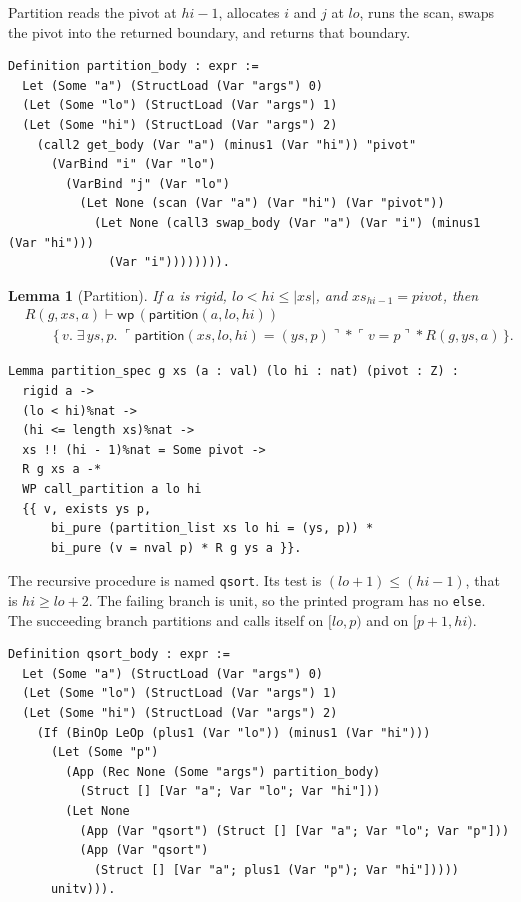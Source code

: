 \documentclass[11pt]{article}
\newtheorem{lemma}[theorem]{Lemma}
\newcommand{\sep}{\mathbin{*}}
\newcommand{\Wpre}{\mathsf{wp}}
\newcommand{\pure}[1]{\ulcorner #1 \urcorner}
\begin{document}
Partition reads the pivot at \(hi - 1\), allocates \(i\) and \(j\) at \(lo\), runs the scan, swaps the pivot into the returned boundary, and returns that boundary.

\begin{lstlisting}
Definition partition_body : expr :=
  Let (Some "a") (StructLoad (Var "args") 0)
  (Let (Some "lo") (StructLoad (Var "args") 1)
  (Let (Some "hi") (StructLoad (Var "args") 2)
    (call2 get_body (Var "a") (minus1 (Var "hi")) "pivot"
      (VarBind "i" (Var "lo")
        (VarBind "j" (Var "lo")
          (Let None (scan (Var "a") (Var "hi") (Var "pivot"))
            (Let None (call3 swap_body (Var "a") (Var "i") (minus1 (Var "hi")))
              (Var "i")))))))).
\end{lstlisting}

\begin{lemma}[Partition]
If \(a\) is rigid, \(lo < hi \le \lvert xs \rvert\), and \(xs_{hi-1} = \mathit{pivot}\), then
\[
\begin{aligned}
&R(g, xs, a) \vdash \Wpre\,(\mathsf{partition}(a, lo, hi))\\
&\qquad \{\,v.\; \exists\, ys, p.\;
  \pure{\mathsf{partition}(xs, lo, hi) = (ys, p)} \sep
  \pure{v = p} \sep R(g, ys, a)\,\}.
\end{aligned}
\]
\end{lemma}

\begin{lstlisting}
Lemma partition_spec g xs (a : val) (lo hi : nat) (pivot : Z) :
  rigid a ->
  (lo < hi)%nat ->
  (hi <= length xs)%nat ->
  xs !! (hi - 1)%nat = Some pivot ->
  R g xs a -*
  WP call_partition a lo hi
  {{ v, exists ys p,
      bi_pure (partition_list xs lo hi = (ys, p)) *
      bi_pure (v = nval p) * R g ys a }}.
\end{lstlisting}

The recursive procedure is named \texttt{qsort}.
Its test is \((lo + 1) \le (hi - 1)\), that is \(hi \ge lo + 2\).
The failing branch is unit, so the printed program has no \texttt{else}.
The succeeding branch partitions and calls itself on \([lo, p)\) and on \([p+1, hi)\).

\begin{lstlisting}
Definition qsort_body : expr :=
  Let (Some "a") (StructLoad (Var "args") 0)
  (Let (Some "lo") (StructLoad (Var "args") 1)
  (Let (Some "hi") (StructLoad (Var "args") 2)
    (If (BinOp LeOp (plus1 (Var "lo")) (minus1 (Var "hi")))
      (Let (Some "p")
        (App (Rec None (Some "args") partition_body)
          (Struct [] [Var "a"; Var "lo"; Var "hi"]))
        (Let None
          (App (Var "qsort") (Struct [] [Var "a"; Var "lo"; Var "p"]))
          (App (Var "qsort")
            (Struct [] [Var "a"; plus1 (Var "p"); Var "hi"]))))
      unitv))).
\end{lstlisting}
\end{document}
